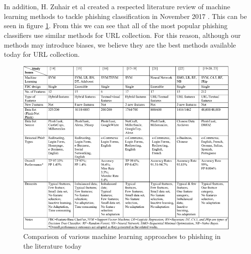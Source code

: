 \documentclass[12pt,twoside]{report}
\begin{document}
\\\\
In addition, H. Zuhair et al created a respected literature review of machine learning methods to tackle phishing classification in November 2017 \cite{issuesandperspectives}. This can be seen in figure \ref{fig:comparisontable}. From this we can see that all of the most popular phishing classifiers use similar methods for URL collection. For this reason, although our methods may introduce biases, we believe they are the best methods available today for URL collection.
\begin{figure}
    \centering
    \includegraphics[width=\linewidth]{images/comparisontable.png}
    \caption{Comparison of various machine learning approaches to phishing in the literature today \cite{issuesandperspectives}}
    \label{fig:comparisontable}
\end{figure}
\clearpage
\end{document}
